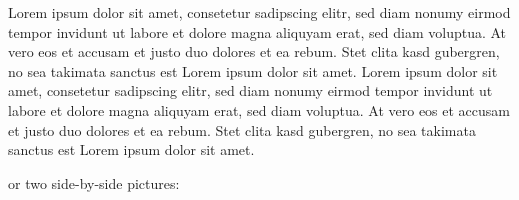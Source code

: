 Lorem ipsum dolor sit amet, consetetur sadipscing elitr, sed diam nonumy eirmod tempor invidunt ut labore et dolore magna aliquyam erat, sed diam voluptua. At vero eos et accusam et justo duo dolores et ea rebum. Stet clita kasd gubergren, no sea takimata sanctus est Lorem ipsum dolor sit amet. Lorem ipsum dolor sit amet, consetetur sadipscing elitr, sed diam nonumy eirmod tempor invidunt ut labore et dolore magna aliquyam erat, sed diam voluptua. At vero eos et accusam et justo duo dolores et ea rebum. Stet clita kasd gubergren, no sea takimata sanctus est Lorem ipsum dolor sit amet.

or two side-by-side pictures:

\begin{figure}[!ht]
\centering
{}
\hspace{15pt}

\end{figure}
